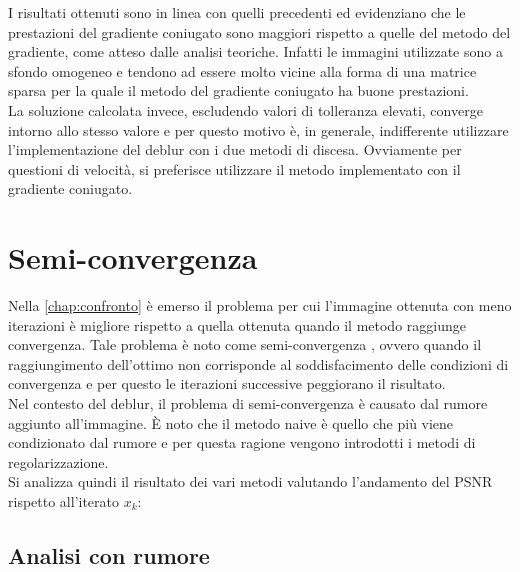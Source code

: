 \documentclass[11pt]{article}
\begin{document}
I risultati ottenuti sono in linea con quelli precedenti ed evidenziano che le prestazioni del gradiente coniugato sono maggiori rispetto a quelle del metodo del gradiente, 
come atteso dalle analisi teoriche. Infatti le immagini utilizzate sono a sfondo omogeneo e tendono ad essere molto vicine alla forma di una matrice sparsa per la quale il metodo del gradiente coniugato ha buone prestazioni.\\
La soluzione calcolata invece, escludendo valori di tolleranza elevati, converge intorno allo stesso valore e per questo motivo è, in generale, indifferente utilizzare l'implementazione del deblur con i due metodi di discesa. Ovviamente per questioni di velocità, si preferisce utilizzare il metodo implementato con il gradiente coniugato.

\section{Semi-convergenza}
\label{chap:semiconv}
Nella \autoref{chap:confronto} è emerso il problema per cui l'immagine ottenuta con meno iterazioni è migliore rispetto a quella ottenuta quando il metodo raggiunge convergenza. 
Tale problema è noto come semi-convergenza \cite{1}\cite{2}\cite{3}, ovvero quando il raggiungimento dell'ottimo non corrisponde al soddisfacimento delle condizioni di convergenza e per questo le iterazioni successive peggiorano il risultato.\\
Nel contesto del deblur, il problema di semi-convergenza è causato dal rumore aggiunto all'immagine. È noto che il metodo naive è quello che più viene condizionato dal rumore e per questa ragione vengono introdotti i metodi di regolarizzazione.\\
Si analizza quindi il risultato dei vari metodi valutando l'andamento del PSNR rispetto all'iterato $x_{k}$:

\subsection{Analisi con rumore}
\end{document}
